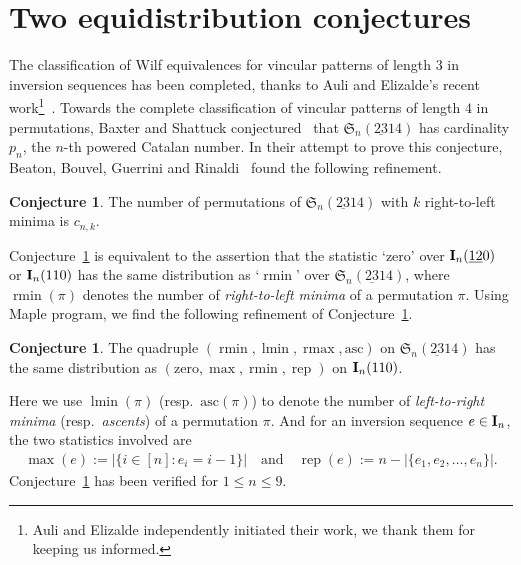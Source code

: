 \documentclass[12pt,A4]{amsart}
\numberwithin{equation}{section}
\theoremstyle{plain}
\theoremstyle{definition}
\newtheorem{conjecture}[theorem]{Conjecture}
\def\S{\mathfrak{S}}
\def\zero{\mathrm{zero}}
\def\asc{\mathrm{asc}}
\def\I{\operatorname{{\bf I}}}
\def\rmin{\operatorname{rmin}}
\def\lmin{\operatorname{lmin}}
\def\rmax{\operatorname{rmax}}
\def\maxi{\operatorname{max}}
\def\rep{\operatorname{rep}}
\begin{document}
\section{Two equidistribution conjectures}





The classification of Wilf equivalences for vincular patterns of length $3$ in inversion sequences has been completed, thanks to Auli and Elizalde's recent work\footnote{Auli and Elizalde independently initiated their work, we thank them for keeping us informed.}~\cite{auli3}.
Towards the complete classification of vincular patterns of length $4$ in permutations, 
 Baxter and Shattuck conjectured~\cite{bs} that $\S_n(\underline{23}14)$ has cardinality $p_n$, the $n$-th powered Catalan number. In their attempt to prove this conjecture, Beaton, Bouvel, Guerrini and Rinaldi~\cite[Conj.~23]{bbgr} found the following refinement.
\begin{conjecture}\label{23-1-4}
The number of permutations of $\S_n(\underline{23}14)$ with $k$ right-to-left minima is $c_{n,k}$. 
\end{conjecture}

Conjecture~\ref{23-1-4} is equivalent to the assertion that the statistic `$\zero$' over $\I_n(\underline{12}0)$ or $\I_n(110)$ has the same distribution as `$\rmin$' over $\S_n(\underline{23}14)$, where $\rmin(\pi)$ denotes the number of {\em right-to-left minima} of a permutation $\pi$. 
Using Maple program, we find the following refinement of Conjecture~\ref{23-1-4}. 

\begin{conjecture}\label{conj:fu-lin}
 The quadruple $(\rmin,\lmin,\rmax,\asc)$ on $\S_n(\underline{23}14)$ has the same distribution as $(\zero,\maxi,\rmin,\rep)$ on $\I_n(110)$. 
\end{conjecture}
Here  we use $\lmin(\pi)$ (resp.~$\asc(\pi)$) to denote  the number of {\em left-to-right minima} (resp.~{\em ascents}) of a permutation $\pi$. And for an inversion sequence $e\in\I_n$, the two statistics  involved are
\begin{align*}
\maxi(e):=|\{i\in[n]: e_i=i-1\}| \quad\text{and}\quad\rep(e):=n-|\{e_1,e_2,\ldots,e_n\}|.
\end{align*}
Conjecture~\ref{conj:fu-lin} has been verified for $1\leq n\leq9$.
\end{document}
